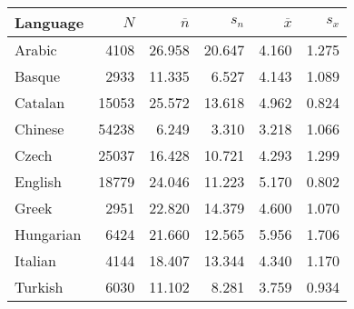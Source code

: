 \begin{tabular}{lrrrrr}
\toprule
 Language   &   $N$ &   $\overline n$ &   $s_n$ &   $\overline x$ &   $s_x$ \\
\midrule
 Arabic     &  4108 &          26.958 &  20.647 &           4.160 &   1.275 \\
 Basque     &  2933 &          11.335 &   6.527 &           4.143 &   1.089 \\
 Catalan    & 15053 &          25.572 &  13.618 &           4.962 &   0.824 \\
 Chinese    & 54238 &           6.249 &   3.310 &           3.218 &   1.066 \\
 Czech      & 25037 &          16.428 &  10.721 &           4.293 &   1.299 \\
 English    & 18779 &          24.046 &  11.223 &           5.170 &   0.802 \\
 Greek      &  2951 &          22.820 &  14.379 &           4.600 &   1.070 \\
 Hungarian  &  6424 &          21.660 &  12.565 &           5.956 &   1.706 \\
 Italian    &  4144 &          18.407 &  13.344 &           4.340 &   1.170 \\
 Turkish    &  6030 &          11.102 &   8.281 &           3.759 &   0.934 \\
\bottomrule
\end{tabular}